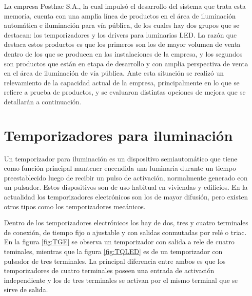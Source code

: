 La empresa Posthac S.A., la cual impulsó el desarrollo del sistema que trata esta memoria, cuenta con una amplia línea de productos en el área de iluminación automática e iluminación para vía pública, de los cuales hay dos grupos que se destacan: los temporizadores y los drivers para luminarias LED. La razón que destaca estos productos es que los primeros son los de mayor volumen de venta dentro de los que se producen en las instalaciones de la empresa, y los segundos son productos que están en etapa de desarrollo y con amplia perspectiva de venta en el área de iluminación de vía pública.
Ante esta situación se realizó un relevamiento de la capacidad actual de la empresa, principalmente en lo que se refiere a prueba de productos, y se evaluaron distintas opciones de mejora que se detallarán a continuación.


\section{Temporizadores para iluminación}

Un temporizador para iluminación es un dispositivo semiautomático que tiene como función principal mantener encendida una luminaria durante un tiempo preestablecido luego de recibir un pulso de activación, normalmente generado con un pulsador. Estos dispositivos son de uso habitual en viviendas y edificios. En la actualidad los temporizadores electrónicos son los de mayor difusión, pero existen otros tipos como los temporizadores mecánicos.

Dentro de los temporizadores electrónicos los hay de dos, tres y cuatro terminales de conexión, de tiempo fijo o ajustable y con salidas conmutadas por relé o triac. En la figura \ref{fig:TGE} se observa un temporizador con salida a rele de cuatro teminales, mientras que la figura \ref{fig:TQLED} es de un temporizador con pulsador de tres terminales. La principal diferencia entre ambos es que los temporizadores de cuatro terminales poseen una entrada de activación independiente y los de tres terminales se activan por el mismo terminal que se sirve de salida.


